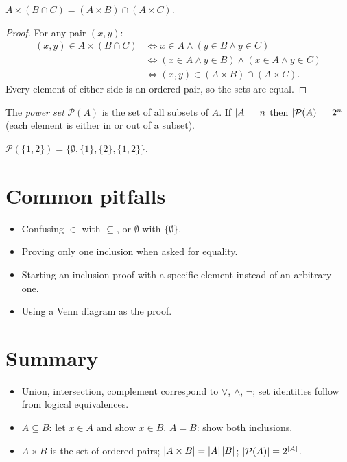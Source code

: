 \begin{proposition}
$A \times (B \cap C) = (A \times B) \cap (A \times C)$.
\end{proposition}
\begin{proof}
For any pair $(x,y)$:
\begin{align*}
(x,y) \in A\times(B\cap C) &\iff x \in A \wedge (y \in B \wedge y \in C)\\
&\iff (x \in A \wedge y \in B)\wedge(x \in A \wedge y \in C)\\
&\iff (x,y) \in (A\times B)\cap(A \times C).
\end{align*}
Every element of either side is an ordered pair, so the sets are equal.
\end{proof}

\begin{definition}
The \emph{power set} $\mathcal{P}(A)$ is the set of all subsets of $A$. If $\left\lvert A \right\rvert = n$ then
$\left\lvert \mathcal P(A) \right\rvert = 2^n$ (each element is either in or out of a subset).
\end{definition}

\begin{example}
$\mathcal P(\{1,2\}) = \{\emptyset,\{1\},\{2\},\{1,2\}\}$.
\end{example}

\section{Common pitfalls}
\begin{itemize}
  \item Confusing $\in$ with $\subseteq$, or $\emptyset$ with $\{\emptyset\}$.
  \item Proving only one inclusion when asked for equality.
  \item Starting an inclusion proof with a specific element instead of an arbitrary one.
  \item Using a Venn diagram as the proof.
\end{itemize}

\section{Summary}
\begin{itemize}
  \item Union, intersection, complement correspond to $\vee$, $\wedge$, $\neg$; set identities
        follow from logical equivalences.
  \item $A \subseteq B$: let $x \in A$ and show $x \in B$. $A = B$: show both inclusions.
  \item $A \times B$ is the set of ordered pairs; $\left\lvert A\times B \right\rvert = \left\lvert A \right\rvert\left\lvert B \right\rvert$;
        $\left\lvert \mathcal P(A) \right\rvert = 2^{\left\lvert A \right\rvert}$.
\end{itemize}
